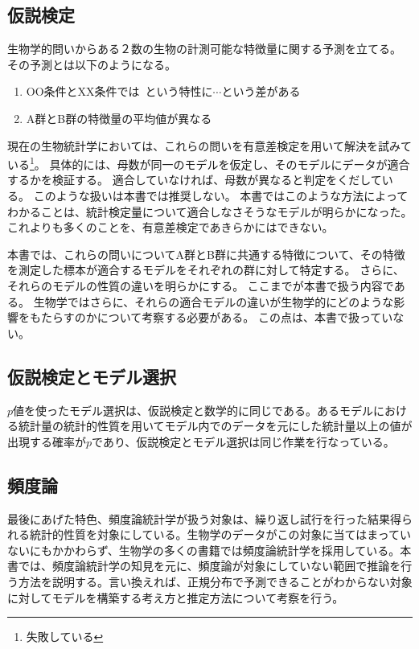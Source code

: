 \subsection{仮説検定}
生物学的問いからある２数の生物の計測可能な特徴量に関する予測を立てる。
その予測とは以下のようになる。
\begin{enumerate}
    \item OO条件とXX条件では~という特性に$\cdots$という差がある
    \item A群とB群の特徴量の平均値が異なる
\end{enumerate}
現在の生物統計学においては、これらの問いを有意差検定を用いて解決を試みている\footnote{失敗している}。
具体的には、母数が同一のモデルを仮定し、そのモデルにデータが適合するかを検証する。
適合していなければ、母数が異なると判定をくだしている。
このような扱いは本書では推奨しない。
本書ではこのような方法によってわかることは、統計検定量について適合しなさそうなモデルが明らかになった。
これよりも多くのことを、有意差検定であきらかにはできない。

本書では、これらの問いについてA群とB群に共通する特徴について、その特徴を測定した標本が適合するモデルをそれぞれの群に対して特定する。
さらに、それらのモデルの性質の違いを明らかにする。
ここまでが本書で扱う内容である。
生物学ではさらに、それらの適合モデルの違いが生物学的にどのような影響をもたらすのかについて考察する必要がある。
この点は、本書で扱っていない。


\subsection{仮説検定とモデル選択}
$p$値を使ったモデル選択は、仮説検定と数学的に同じである。あるモデルにおける統計量の統計的性質を用いてモデル内でのデータを元にした統計量以上の値が出現する確率が$p$であり、仮説検定とモデル選択は同じ作業を行なっている。

\subsection{頻度論}
最後にあげた特色、頻度論統計学が扱う対象は、繰り返し試行を行った結果得られる統計的性質を対象にしている。生物学のデータがこの対象に当てはまっていないにもかかわらず、生物学の多くの書籍では頻度論統計学を採用している。本書では、頻度論統計学の知見を元に、頻度論が対象にしていない範囲で推論を行う方法を説明する。言い換えれば、正規分布で予測できることがわからない対象に対してモデルを構築する考え方と推定方法について考察を行う。

